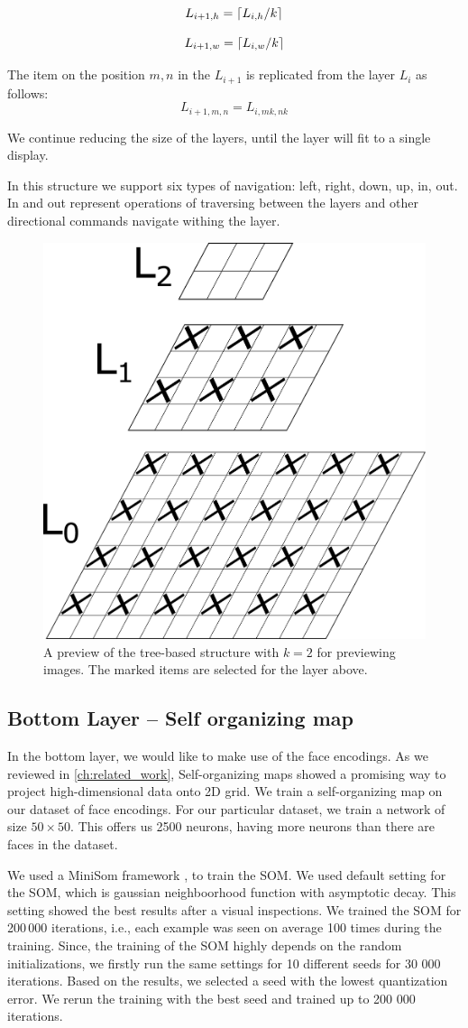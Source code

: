 $$
    L_{i+1, h} = \ceil*{L_{i, h} / k}
$$

$$
    L_{i+1, w} = \ceil*{L_{i, w} / k}
$$


The item on the position $m, n$ in the $L_{i+1}$ is replicated from the layer $L_i$ as follows:
$$
    L_{i+1, m, n} = L_{i, mk, nk} 
$$

We continue reducing the size of the layers, until the layer will fit to a single display.

In this structure we support six types of navigation: left, right, down, up, in, out. In and out represent operations of traversing between the layers and other directional commands navigate withing the layer. 

\begin{figure}
    \centering
    \includegraphics[width=0.3\linewidth]{img/tree-structure.pdf}
    \caption{A preview of the tree-based structure with $k = 2$ for previewing images. The marked items are selected for the layer above.}
    \label{fig:tree_structure}
\end{figure}

\subsection{Bottom Layer -- Self organizing map}

In the bottom layer, we would like to make use of the face encodings. As we reviewed in \autoref{ch:related_work}, Self-organizing maps showed a promising way to project high-dimensional data onto 2D grid. We train a self-organizing map on our dataset of face encodings. For our particular dataset, we train a network of size $50\times 50$. This offers us 2500 neurons, having more neurons than there are faces in the dataset.

We used a MiniSom framework \citep{vettigli2013minisom}, to train the SOM. We used default setting for the SOM, which is gaussian neighboorhood function with asymptotic decay. This setting showed the best results after a visual inspections. We trained the SOM for 200\,000 iterations, i.e., each example was seen on average 100 times during the training. Since, the training of the SOM highly depends on the random initializations, we firstly run the same settings for 10 different seeds for 30 000 iterations. Based on the results, we selected a seed with the lowest quantization error. We rerun the training with the best seed and trained up to 200 000 iterations.

